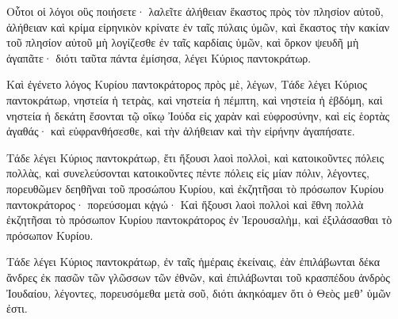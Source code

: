 {Οὗτοι οἱ λόγοι οὓς ποιήσετε· λαλεῖτε ἀλήθειαν ἕκαστος πρὸς τὸν πλησίον αὐτοῦ, ἀλήθειαν καὶ κρίμα εἰρηνικὸν κρίνατε ἐν ταῖς πύλαις ὑμῶν,
καὶ ἔκαστος τὴν κακίαν τοῦ πλησίον αὐτοῦ μὴ λογίζεσθε ἐν ταῖς καρδίαις ὑμῶν, καὶ ὅρκον ψευδῆ μὴ ἀγαπᾶτε· διότι ταῦτα πάντα ἐμίσησα, λέγει Κύριος παντοκράτωρ.
\par }{\PP {}Καὶ ἐγένετο λόγος Κυρίου παντοκράτορος πρὸς μὲ, λέγων,
Τάδε λέγει Κύριος παντοκράτωρ, νηστεία ἡ τετρὰς, καὶ νηστεία ἡ πέμπτη, καὶ νηστεία ἡ ἑβδόμη, καὶ νηστεία ἡ δεκάτη ἔσονται τῷ οἴκῳ Ἰούδα εἰς χαρὰν καὶ εὐφροσύνην, καὶ εἰς ἑορτὰς ἀγαθάς· καὶ εὐφρανθήσεσθε, καὶ τὴν ἀλήθειαν καὶ τὴν εἰρήνην ἀγαπήσατε.
\par }{\PP {}Τάδε λέγει Κύριος παντοκράτωρ, ἔτι ἥξουσι λαοὶ πολλοὶ, καὶ κατοικοῦντες πόλεις πολλὰς,
καὶ συνελεύσονται κατοικοῦντες πέντε πόλεις εἰς μίαν πόλιν, λέγοντες, πορευθῶμεν δεηθῆναι τοῦ προσώπου Κυρίου, καὶ ἐκζητῆσαι τὸ πρόσωπον Κυρίου παντοκράτορος· πορεύσομαι κᾀγώ·
Καὶ ἥξουσι λαοὶ πολλοὶ καὶ ἔθνη πολλὰ ἐκζητῆσαι τὸ πρόσωπον Κυρίου παντοκράτορος ἐν Ἱερουσαλὴμ, καὶ ἐξιλάσασθαι τὸ πρόσωπον Κυρίου.
\par }{\PP {}Τάδε λέγει Κύριος παντοκράτωρ, ἐν ταῖς ἡμέραις ἐκείναις, ἐὰν ἐπιλάβωνται δέκα ἄνδρες ἐκ πασῶν τῶν γλῶσσων τῶν ἐθνῶν, καὶ ἐπιλάβωνται τοῦ κρασπέδου ἀνδρὸς Ἰουδαίου, λέγοντες, πορευσόμεθα μετὰ σοῦ, διότι ἀκηκόαμεν ὅτι ὁ Θεὸς μεθʼ ὑμῶν ἐστι.

}
